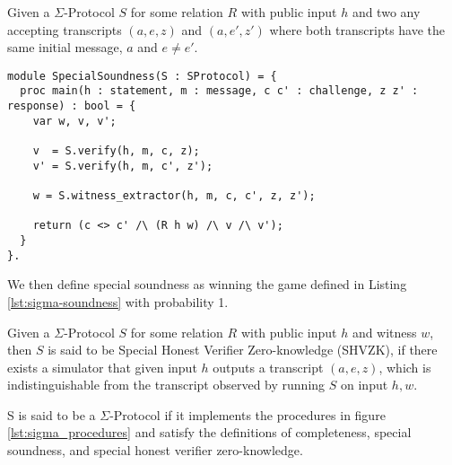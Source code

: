 \begin{definition}
\label{def:sigma:soundness}
Given a $\Sigma$-Protocol $S$ for some relation $R$ with public input $h$
and two any accepting transcripts $(a,e,z)$ and $(a,e',z')$
where both transcripts have the same initial message, $a$ and $e \neq e'$.

\begin{lstlisting}[float, label=lst:sigma-soundness, caption= 2-special soundness game]
module SpecialSoundness(S : SProtocol) = {
  proc main(h : statement, m : message, c c' : challenge, z z' : response) : bool = {
    var w, v, v';

    v  = S.verify(h, m, c, z);
    v' = S.verify(h, m, c', z');

    w = S.witness_extractor(h, m, c, c', z, z');

    return (c <> c' /\ (R h w) /\ v /\ v');
  }
}.
\end{lstlisting}

We then define special soundness as winning the game
defined in Listing \ref{lst:sigma-soundness} with probability 1.

\end{definition}

\begin{definition}
\label{def:sigma:shvzk}
Given a $\Sigma$-Protocol $S$ for some relation $R$ with public input $h$ and
witness $w$, then $S$ is said to be Special Honest Verifier Zero-knowledge
(SHVZK), if there exists a simulator that given input $h$ outputs a
transcript $(a,e,z)$, which is indistinguishable from the transcript observed by
running $S$ on input $h, w$.


\end{definition}

\begin{definition}
\label{def:sigma-protocol}
  S is said to be a $\Sigma$-Protocol if it implements the procedures in figure
  \ref{lst:sigma_procedures} and satisfy the definitions of completeness,
  special soundness, and special honest verifier zero-knowledge.
\end{definition}



